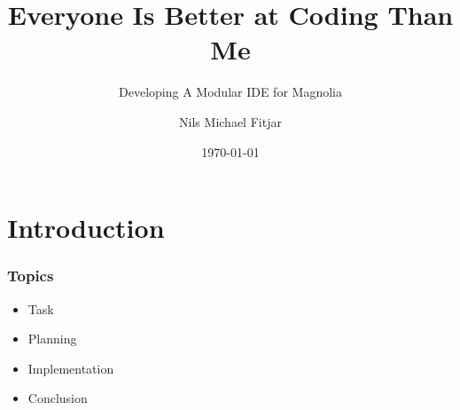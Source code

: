\documentclass{beamer}
\title{Everyone Is Better at Coding Than Me}
\subtitle{Developing A Modular IDE for Magnolia}
\author{Nils Michael Fitjar}
\institute{University of Bergen}
\date{\today}
\begin{document}
\section{Introduction}

\begin{frame}
    \frametitle{Topics}
    \begin{itemize}
      \item Task
      \item Planning
      \item Implementation
      \item Conclusion
    \end{itemize}
\end{frame}








\end{document}
